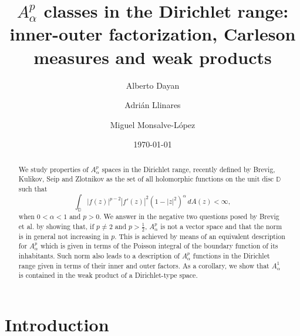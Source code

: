 \documentclass[12pt]{amsart}
\title[$A^p_\alpha$ classes in the Dirichlet range]{$A^p_\alpha$ classes in the Dirichlet range: inner-outer factorization, Carleson measures and weak products}
\author[A. Dayan]{Alberto Dayan}
\author[A. Llinares]{Adri\'{a}n Llinares}
\author[M. Monsalve-López]{Miguel Monsalve-López}
\date{\today}
\theoremstyle{definition}
\numberwithin{equation}{section}
\begin{document}
	
    \begin{abstract} 
        We study properties of $A^p_\alpha$ spaces in the Dirichlet range, recently defined by Brevig, Kulikov, Seip and Zlotnikov as the set of all holomorphic functions on the unit disc $\mathbb{D}$ such that
            \[
                \int_{\mathbb{D}} |f(z)|^{p-2} |f'(z)|^2 (1 - |z|^2)^{\alpha} \, dA(z) < \infty,
            \]
            when $0<\alpha < 1$ and $p > 0$. We answer in the negative two questions posed by Brevig et al. by showing that, if $p\ne2$ and $p > \frac{1}{2}$, $A^p_\alpha$ is not a vector space and that the norm is in general not increasing in $p$. This is achieved by means of an equivalent description for $A^p_\alpha$ which is given in terms of the Poisson integral of the boundary function of its inhabitants. Such norm also leads to a description of $A^p_\alpha$ functions in the Dirichlet range given in terms of their inner and outer factors. As a corollary, we show that $A^1_\alpha$ is contained in the weak product of a Dirichlet-type space.
	\end{abstract}
    
	\maketitle
	
	


    \section{Introduction}
\end{document}
